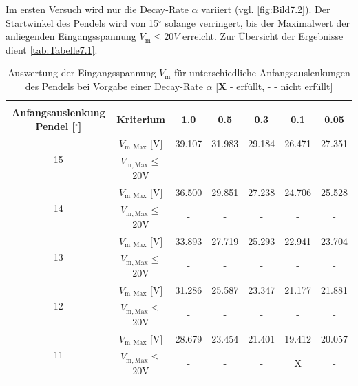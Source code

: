 
Im ersten Versuch wird nur die Decay-Rate $\alpha$ variiert (vgl. \autoref{fig:Bild7.2}). Der Startwinkel des Pendels wird von 15$^\circ$ solange verringert, bis der Maximalwert der anliegenden Eingangsspannung $V_{\mathrm{m}} \leq 20V$ erreicht. Zur Übersicht der Ergebnisse dient \autoref{tab:Tabelle7.1}.

\renewcommand{\arraystretch}{1.2}
\begin{table}[H]
    \centering
    \begin{tabular}{|c|c|c|c|c|c|c|}
        \hline
        & & \multicolumn{5}{c|}{ \boldmath{$\alpha$} } \\
        \makecell{\textbf{Anfangsauslenkung} \\ \textbf{Pendel [$^\circ$]}} & \textbf{Kriterium} & \textbf{1.0} & \textbf{0.5} & \textbf{0.3} & \textbf{0.1} & \textbf{0.05} \\
        \hline
        \multirow{2}{*}{15} & $V_{\mathrm{m,Max}}$ [V] & 39.107 & 31.983 & 29.184 & 26.471 & 27.351 \\
        & $V_{\mathrm{m,Max}} \leq$ 20V & - & - & - & - & -\\
        \hline
        \multirow{2}{*}{14} & $V_{\mathrm{m,Max}}$ [V] & 36.500 & 29.851 & 27.238 & 24.706 & 25.528 \\
        & $V_{\mathrm{m,Max}} \leq$ 20V & - & - & - & - & -\\
        \hline
        \multirow{2}{*}{13} & $V_{\mathrm{m,Max}}$ [V] & 33.893 & 27.719 & 25.293 & 22.941 & 23.704 \\
        & $V_{\mathrm{m,Max}} \leq$ 20V & - & - & - & - & -\\
        \hline
        \multirow{2}{*}{12} & $V_{\mathrm{m,Max}}$ [V] & 31.286 & 25.587 & 23.347 & 21.177 & 21.881 \\
        & $V_{\mathrm{m,Max}} \leq$ 20V & - & - & - & - & -\\
        \hline
        \multirow{2}{*}{11} & $V_{\mathrm{m,Max}}$ [V] & 28.679 & 23.454 & 21.401 & 19.412 & 20.057 \\
        & $V_{\mathrm{m,Max}} \leq$ 20V & - & - & - & X & -\\
        \hline
    \end{tabular}
    \caption[Auswertung von $V_{\mathrm{m}}$ für unterschiedliche Anfangsauslenkungen]{Auswertung der Eingangsspannung $V_{\mathrm{m}}$ für unterschiedliche Anfangsauslenkungen des Pendels bei Vorgabe einer Decay-Rate $\alpha$ [$\textbf{X}$ - erfüllt, $\textbf{-}$ - nicht erfüllt]} 
    \label{tab:Tabelle7.1}
\end{table}
\renewcommand{\arraystretch}{1}

